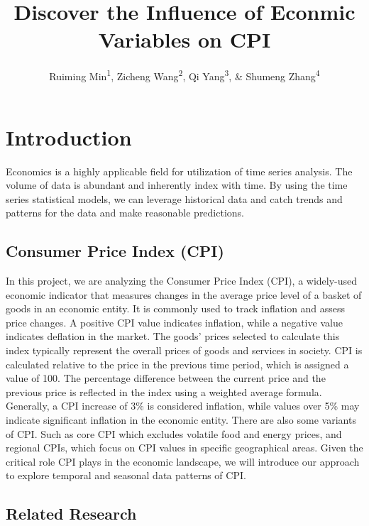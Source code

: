 \documentclass[
  man,floatsintext,
  man]{apa6}
\title{Discover the Influence of Econmic Variables on CPI}
\author{Ruiming Min\textsuperscript{1}, Zicheng Wang\textsuperscript{2}, Qi Yang\textsuperscript{3}, \& Shumeng Zhang\textsuperscript{4}}
\date{}
\affiliation{\vspace{0.5cm}\textsuperscript{2} UIUC}
\begin{document}
\maketitle

\hypertarget{introduction}{%
\section{Introduction}\label{introduction}}

Economics is a highly applicable field for utilization of time series analysis. The volume of data is abundant and inherently index with time. By using the time series statistical models, we can leverage historical data and catch trends and patterns for the data and make reasonable predictions.

\hypertarget{consumer-price-index-cpi}{%
\subsection{Consumer Price Index (CPI)}\label{consumer-price-index-cpi}}

In this project, we are analyzing the Consumer Price Index (CPI), a widely-used economic indicator that measures changes in the average price level of a basket of goods in an economic entity. It is commonly used to track inflation and assess price changes. A positive CPI value indicates inflation, while a negative value indicates deflation in the market. The goods' prices selected to calculate this index typically represent the overall prices of goods and services in society.
CPI is calculated relative to the price in the previous time period, which is assigned a value of 100. The percentage difference between the current price and the previous price is reflected in the index using a weighted average formula. Generally, a CPI increase of 3\% is considered inflation, while values over 5\% may indicate significant inflation in the economic entity. There are also some variants of CPI. Such as core CPI which excludes volatile food and energy prices, and regional CPIs, which focus on CPI values in specific geographical areas.
Given the critical role CPI plays in the economic landscape, we will introduce our approach to explore temporal and seasonal data patterns of CPI.

\hypertarget{related-research}{%
\subsection{Related Research}\label{related-research}}
\end{document}
